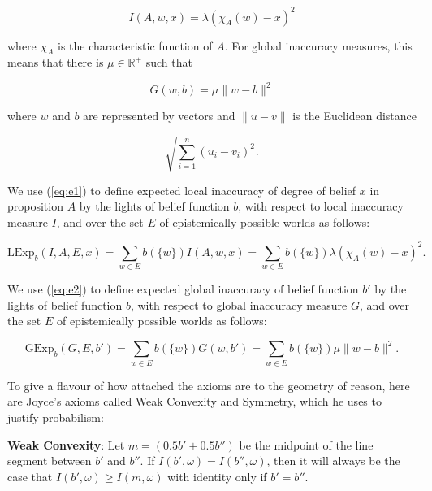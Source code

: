 \documentclass[11pt]{article}
\begin{document}
\begin{equation}
  \label{eq:e1}
  I(A,w,x)=\lambda\left(\chi_{A}(w)-x\right)^{2}
\end{equation}

where $\chi_{A}$ is the characteristic function of $A$. For global
inaccuracy measures, this means that there is $\mu\in\mathbb{R}^{+}$
such that

\begin{equation}
  \label{eq:e2}
  G(w,b)=\mu\|w-b\|^{2}
\end{equation}

where $w$ and $b$ are represented by vectors and $\|u-v\|$ is the
Euclidean distance

\begin{equation}
  \label{eq:e3}
  \sqrt{\sum_{i=1}^{n}\left(u_{i}-v_{i}\right)^{2}}.
\end{equation}

We use (\ref{eq:e1}) to define expected local inaccuracy of degree of
belief $x$ in proposition $A$ by the lights of belief function $b$,
with respect to local inaccuracy measure $I$, and over the set $E$ of
epistemically possible worlds as follows:

\begin{equation}
  \label{eq:eli}
  \mbox{LExp}_{b}(I,A,E,x)=\sum_{w\in{}E}b(\{w\})I(A,w,x)=\sum_{w\in{}E}b(\{w\})\lambda\left(\chi_{A}(w)-x\right)^{2}.
\end{equation}

We use (\ref{eq:e2}) to define expected global inaccuracy of belief
function $b'$ by the lights of belief function $b$, with respect to
global inaccuracy measure $G$, and over the set $E$ of epistemically
possible worlds as follows:

\begin{equation}
  \label{eq:egi}
  \mbox{GExp}_{b}(G,E,b')=\sum_{w\in{}E}b(\{w\})G(w,b')=\sum_{w\in{}E}b(\{w\})\mu\|w-b\|^{2}.
\end{equation}

To give a flavour of how attached the axioms are to the geometry of
reason, here are Joyce's axioms called Weak Convexity and Symmetry,
which he uses to justify probabilism:

\begin{quotex}
  \textbf{Weak Convexity}: Let $m=(0.5b'+0.5b'')$ be the midpoint of the line
  segment between $b'$ and $b''$. If $I(b',\omega)=I(b'',\omega)$,
  then it will always be the case that $I(b',\omega)\geq{}I(m,\omega)$
  with identity only if $b'=b''$.
\end{quotex}
\end{document}
